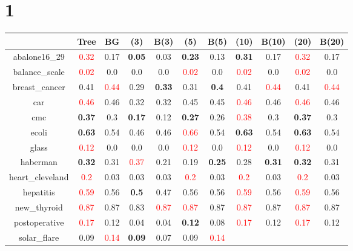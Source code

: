 \documentclass{article}%
\begin{document}
\section*{1}%
\begin{tabular}{c|cccccccccc}%
\hline%
&Tree&BG&(3)&B(3)&(5)&B(5)&(10)&B(10)&(20)&B(20)\\%
\hline%
abalone16\_29&\textcolor{red}{ 
0.32
}&0.17&\textbf{0.05}&0.03&\textbf{0.23}&0.13&\textbf{0.31}&0.17&\textcolor{red}{ 
0.32
}&0.17\\%
\hline%
balance\_scale&\textcolor{red}{ 
0.02
}&0.0&0.0&0.0&\textcolor{red}{ 
0.02
}&0.0&\textcolor{red}{ 
0.02
}&0.0&\textcolor{red}{ 
0.02
}&0.0\\%
\hline%
breast\_cancer&0.41&\textcolor{red}{ 
0.44
}&0.29&\textbf{0.33}&0.31&\textbf{0.4}&0.41&\textcolor{red}{ 
0.44
}&0.41&\textcolor{red}{ 
0.44
}\\%
\hline%
car&\textcolor{red}{ 
0.46
}&0.46&0.32&0.32&0.45&0.45&\textcolor{red}{ 
0.46
}&0.46&\textcolor{red}{ 
0.46
}&0.46\\%
\hline%
cmc&\textbf{0.37}&0.3&\textbf{0.17}&0.12&\textbf{0.27}&0.26&\textcolor{red}{ 
0.38
}&0.3&\textbf{0.37}&0.3\\%
\hline%
ecoli&\textbf{0.63}&0.54&0.46&0.46&\textcolor{red}{ 
0.66
}&0.54&\textbf{0.63}&0.54&\textbf{0.63}&0.54\\%
\hline%
glass&\textcolor{red}{ 
0.12
}&0.0&0.0&0.0&\textcolor{red}{ 
0.12
}&0.0&\textcolor{red}{ 
0.12
}&0.0&\textcolor{red}{ 
0.12
}&0.0\\%
\hline%
haberman&\textbf{0.32}&0.31&\textcolor{red}{ 
0.37
}&0.21&0.19&\textbf{0.25}&0.28&\textbf{0.31}&\textbf{0.32}&0.31\\%
\hline%
heart\_cleveland&\textcolor{red}{ 
0.2
}&0.03&0.03&0.03&\textcolor{red}{ 
0.2
}&0.03&\textcolor{red}{ 
0.2
}&0.03&\textcolor{red}{ 
0.2
}&0.03\\%
\hline%
hepatitis&\textcolor{red}{ 
0.59
}&0.56&\textbf{0.5}&0.47&0.56&0.56&\textcolor{red}{ 
0.59
}&0.56&\textcolor{red}{ 
0.59
}&0.56\\%
\hline%
new\_thyroid&\textcolor{red}{ 
0.87
}&0.87&0.83&\textcolor{red}{ 
0.87
}&\textcolor{red}{ 
0.87
}&0.87&\textcolor{red}{ 
0.87
}&0.87&\textcolor{red}{ 
0.87
}&0.87\\%
\hline%
postoperative&\textcolor{red}{ 
0.17
}&0.12&0.04&0.04&\textbf{0.12}&0.08&\textcolor{red}{ 
0.17
}&0.12&\textcolor{red}{ 
0.17
}&0.12\\%
\hline%
solar\_flare&0.09&\textcolor{red}{ 
0.14
}&\textbf{0.09}&0.07&0.09&\textcolor{red}{ 
0.14
}
\end{tabular}
\end{document}
